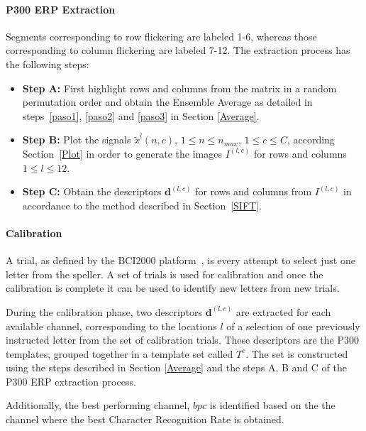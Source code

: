 \documentclass[utf8]{frontiersSCNS} %
\begin{document}
\paragraph{P300 ERP Extraction}
Segments corresponding to row flickering are labeled 1-6, whereas those corresponding to column flickering are labeled 7-12.  The extraction process has the following steps:

\begin{itemize}

\item \textbf{Step A:}\label{pasoa} First highlight rows and columns from the matrix in a random permutation order and obtain the Ensemble Average as detailed in steps~\ref{paso1}, \ref{paso2} and \ref{paso3} in Section \ref{Average}.
\item \textbf{Step B:}\label{paso4} Plot the signals $\tilde{x}^l(n,c)$,  $1 \leq n \leq n_{max}$, $1 \leq c \leq C $,  according Section~\ref{Plot} in order to generate the images $I^{(l,c)}$ for rows and columns $1 \leq l \leq 12$.

\item \textbf{Step C:} Obtain the descriptors $ \mathbf{d}^{(l,c)}$ for rows and columns from $I^{(l,c)}$  in accordance to the method described in Section~\ref{SIFT}. 

\end{itemize}

\paragraph{Calibration}

A trial, as defined by the BCI2000 platform~\citep{Schalk2004}, is every attempt to select just one letter from the speller.  A set of trials is used for calibration and once the calibration is complete it can be used to identify new letters from new trials.

During the calibration phase, two descriptors $ \mathbf{d}^{(l,c)}$ are extracted for each available channel, corresponding to the locations $l$ of a selection of one previously instructed letter from the set of calibration trials.  These descriptors are the P300 templates, grouped together in a template set called $ T^c $.   The set is constructed using the steps described in Section \ref{Average} and the steps A, B and C of the P300 ERP extraction process.

Additionally, the best performing channel, $bpc$ is identified based on the the channel where the best Character Recognition Rate is obtained.
\end{document}
